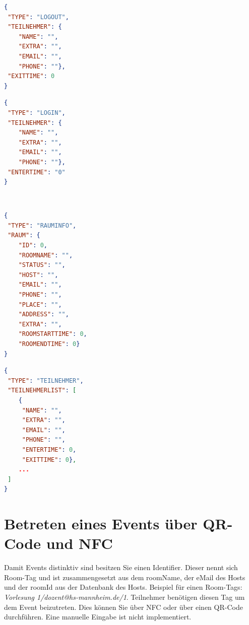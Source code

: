 \begin{minipage}[]{0.45\linewidth}
\begin{lstlisting}[language=json, label={lst:anmeldung}, caption={anmeldung.json}]
{
 "TYPE": "LOGOUT",
 "TEILNEHMER": {
	"NAME": "",
	"EXTRA": "",
	"EMAIL": "",
	"PHONE": ""},
 "EXITTIME": 0
}
\end{lstlisting}
\end{minipage}
\qquad
\begin{minipage}[]{0.45\linewidth}
\begin{lstlisting}[language=json,label={lst:abmeldung}, caption={abmeldung.json}]
{
 "TYPE": "LOGIN",
 "TEILNEHMER": {
	"NAME": "",
	"EXTRA": "",
	"EMAIL": "",
	"PHONE": ""},
 "ENTERTIME": "0"
}
\end{lstlisting}
\end{minipage}
\\
\begin{minipage}[]{0.45\linewidth}
\begin{lstlisting}[language=json, label={lst:rauminfo}, caption={rauminfo.json}]
{
 "TYPE": "RAUMINFO",
 "RAUM": {
	"ID": 0,
	"ROOMNAME": "",
	"STATUS": "",
	"HOST": "",
	"EMAIL": "",
	"PHONE": "",
	"PLACE": "",
	"ADDRESS": "",
	"EXTRA": "",
	"ROOMSTARTTIME": 0,
	"ROOMENDTIME": 0}
}
\end{lstlisting}
\end{minipage}
\qquad
\begin{minipage}[]{0.45\linewidth}
\begin{lstlisting}[language=json, label={lst:teilnehmer}, caption={teilnehmer.json}]
{
 "TYPE": "TEILNEHMER",
 "TEILNEHMERLIST": [
	{
	 "NAME": "",
	 "EXTRA": "",
 	 "EMAIL": "",
 	 "PHONE": "",
 	 "ENTERTIME": 0,
	 "EXITTIME": 0},
	...
 ]
}
\end{lstlisting}
\end{minipage}




\section{Betreten eines Events über QR-Code und NFC}
\label{sec:RoomTag - QR und NFC}
Damit Events distinktiv sind besitzen Sie einen Identifier. Dieser nennt sich Room-Tag und ist zusammengesetzt aus dem roomName, der eMail des Hosts und der roomId aus der Datenbank des Hosts. 
Beispiel für einen Room-Tags: \textit{Vorlesung 1/dozent@hs-mannheim.de/1}.
Teilnehmer benötigen diesen Tag um dem Event beizutreten. Dies können Sie über NFC oder über einen QR-Code durchführen. Eine manuelle Eingabe ist nicht implementiert. 

